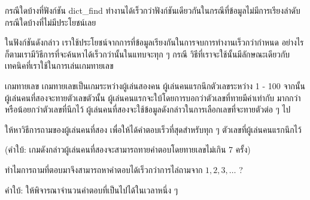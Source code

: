 \begin{quiz}{}
กรณี{\wbr}ใด{\wbr}บ้าง{\wbr}ที่{\wbr}ฟังก์ชัน {\ct dict\_find}
ทำงาน{\wbr}ได้{\wbr}เร็ว{\wbr}กว่า{\wbr}ฟังก์ชัน{\wbr}เดียวกัน{\wbr}ใน{\wbr}กรณี{\wbr}ที่{\wbr}ข้อมูล{\wbr}ไม่{\wbr}มี{\wbr}การ{\wbr}เรียงลำดับ{\wbr}
กรณี{\wbr}ใด{\wbr}บ้าง{\wbr}ที่{\wbr}ไม่{\wbr}มี{\wbr}ประโยชน์{\wbr}เลย{\wbr}
\end{quiz}

ใน{\wbr}ฟังก์ชัน{\wbr}ดังกล่าว เรา{\wbr}ใช้ประโยชน์{\wbr}จาก{\wbr}การ{\wbr}ที่{\wbr}ข้อมูล{\wbr}เรียง{\wbr}กัน{\wbr}ใน{\wbr}การ{\wbr}จบ{\wbr}การ{\wbr}ทำงาน{\wbr}เร็ว{\wbr}กว่า{\wbr}กำหนด{\wbr}
อย่างไรก็ตาม{\wbr}เรา{\wbr}มี{\wbr}วิธีการ{\wbr}ที่{\wbr}จะ{\wbr}ค้นหา{\wbr}ได้{\wbr}เร็ว{\wbr}กว่า{\wbr}นั้น{\wbr}ใน{\wbr}แทบ{\wbr}จะ{\wbr}ทุก ๆ กรณี{\wbr}
วิธี{\wbr}ที่{\wbr}เรา{\wbr}จะ{\wbr}ใช้{\wbr}นั้น{\wbr}มี{\wbr}ลักษณะ{\wbr}เดียวกับ{\wbr}เทคนิค{\wbr}ที่{\wbr}เรา{\wbr}ใช้{\wbr}ใน{\wbr}การ{\wbr}เล่น{\wbr}เกม{\wbr}ทาย{\wbr}เลข{\wbr}

\begin{quiz}{เกม{\wbr}ทาย{\wbr}เลข}
เกม{\wbr}ทาย{\wbr}เลข{\wbr}เป็น{\wbr}เกม{\wbr}ระหว่าง{\wbr}ผู้{\wbr}เล่น{\wbr}สอง{\wbr}คน ผู้{\wbr}เล่น{\wbr}คน{\wbr}แรก{\wbr}นึก{\wbr}ตัวเลข{\wbr}ระหว่าง 1 - 100
จากนั้น{\wbr}ผู้{\wbr}เล่น{\wbr}คน{\wbr}ที่{\wbr}สอง{\wbr}จะ{\wbr}ทาย{\wbr}ตัวเลข{\wbr}ตัว{\wbr}นั้น{\wbr}
ผู้{\wbr}เล่น{\wbr}คน{\wbr}แรก{\wbr}จะ{\wbr}ใบ้{\wbr}โดย{\wbr}การ{\wbr}บอก{\wbr}ว่า{\wbr}ตัวเลข{\wbr}ที่{\wbr}ทาย{\wbr}มี{\wbr}ค่า{\wbr}เท่า{\wbr}กับ มาก{\wbr}กว่า หรือ{\wbr}น้อย{\wbr}กว่า{\wbr}ตัวเลข{\wbr}ที่{\wbr}นึก{\wbr}ไว้{\wbr}
ผู้{\wbr}เล่น{\wbr}คน{\wbr}ที่{\wbr}สอง{\wbr}จะ{\wbr}ใช้{\wbr}ข้อมูล{\wbr}ดังกล่าว{\wbr}ใน{\wbr}การ{\wbr}เลือก{\wbr}เลขที่{\wbr}จะ{\wbr}ทาย{\wbr}ตัว{\wbr}ต่อ ๆ ไป{\wbr}

ให้{\wbr}หา{\wbr}วิธีการ{\wbr}ถาม{\wbr}ของ{\wbr}ผู้{\wbr}เล่น{\wbr}คน{\wbr}ที่{\wbr}สอง เพื่อให้{\wbr}ได้{\wbr}คำตอบ{\wbr}เร็ว{\wbr}ที่สุด{\wbr}สำหรับ{\wbr}ทุก ๆ
ตัวเลข{\wbr}ที่{\wbr}ผู้{\wbr}เล่น{\wbr}คน{\wbr}แรก{\wbr}นึก{\wbr}ไว้{\wbr}

(คำ{\wbr}ใบ้: เกม{\wbr}ดังกล่าว{\wbr}ผู้{\wbr}เล่น{\wbr}คน{\wbr}ที่{\wbr}สอง{\wbr}จะ{\wbr}สามารถ{\wbr}ทาย{\wbr}คำตอบ{\wbr}โดย{\wbr}ทาย{\wbr}เลข{\wbr}ไม่{\wbr}เกิน 7 ครั้ง)
\end{quiz}

\begin{quiz}{}
ทำไม{\wbr}การ{\wbr}ถาม{\wbr}ที่{\wbr}ตอบ{\wbr}มา{\wbr}จึง{\wbr}สามารถ{\wbr}หา{\wbr}คำตอบ{\wbr}ได้{\wbr}เร็ว{\wbr}กว่า{\wbr}การ{\wbr}ไล่{\wbr}ถาม{\wbr}จาก $1,2,3,\ldots$ ? 

คำ{\wbr}ใบ้: ให้{\wbr}พิจารณา{\wbr}จำนวน{\wbr}คำตอบ{\wbr}ที่{\wbr}เป็น{\wbr}ไป{\wbr}ได้{\wbr}ใน{\wbr}เวลา{\wbr}หนึ่ง ๆ
\end{quiz}

